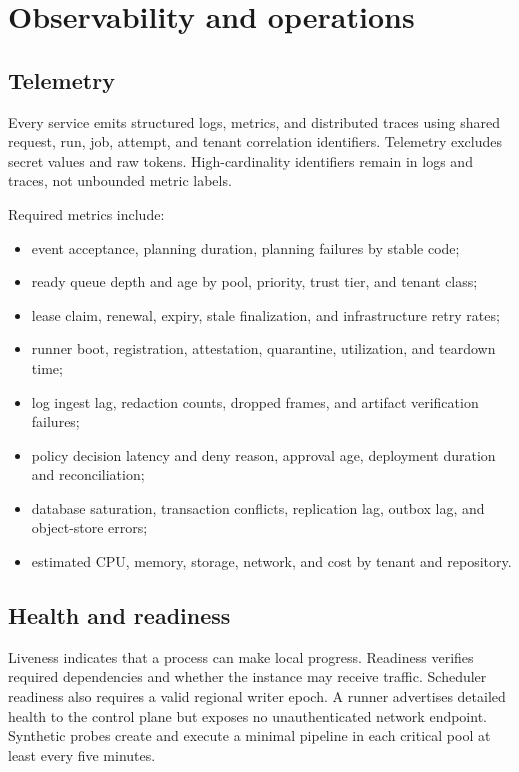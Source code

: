 \section{Observability and operations}

\subsection{Telemetry}

Every service emits structured logs, metrics, and distributed traces using shared
request, run, job, attempt, and tenant correlation identifiers. Telemetry excludes
secret values and raw tokens. High-cardinality identifiers remain in logs and traces,
not unbounded metric labels.

Required metrics include:

\begin{itemize}
  \item event acceptance, planning duration, planning failures by stable code;
  \item ready queue depth and age by pool, priority, trust tier, and tenant class;
  \item lease claim, renewal, expiry, stale finalization, and infrastructure retry rates;
  \item runner boot, registration, attestation, quarantine, utilization, and teardown time;
  \item log ingest lag, redaction counts, dropped frames, and artifact verification failures;
  \item policy decision latency and deny reason, approval age, deployment duration and reconciliation;
  \item database saturation, transaction conflicts, replication lag, outbox lag, and object-store errors;
  \item estimated CPU, memory, storage, network, and cost by tenant and repository.
\end{itemize}

\subsection{Health and readiness}

Liveness indicates that a process can make local progress. Readiness verifies required
dependencies and whether the instance may receive traffic. Scheduler readiness also
requires a valid regional writer epoch. A runner advertises detailed health to the
control plane but exposes no unauthenticated network endpoint. Synthetic probes create
and execute a minimal pipeline in each critical pool at least every five minutes.

